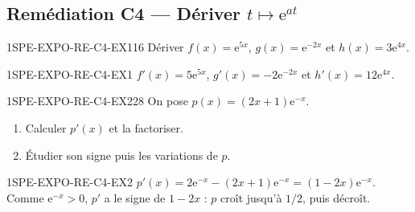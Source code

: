 
\subsection*{Remédiation C4 — Dériver $t\mapsto\mathrm{e}^{at}$}

\begin{exercice}{1SPE-EXPO-RE-C4-EX1}{1}{6}
Dériver $f(x)=\mathrm{e}^{5x}$, $g(x)=\mathrm{e}^{-2x}$ et $h(x)=3\mathrm{e}^{4x}$.
\end{exercice}
\begin{corrige}{1SPE-EXPO-RE-C4-EX1}
$f'(x)=5\mathrm{e}^{5x}$, $g'(x)=-2\mathrm{e}^{-2x}$ et $h'(x)=12\mathrm{e}^{4x}$.
\end{corrige}

\begin{exercice}{1SPE-EXPO-RE-C4-EX2}{2}{8}
On pose $p(x)=(2x+1)\mathrm{e}^{-x}$.
\begin{enumerate}
\item Calculer $p'(x)$ et la factoriser.
\item Étudier son signe puis les variations de $p$.
\end{enumerate}
\end{exercice}
\begin{corrige}{1SPE-EXPO-RE-C4-EX2}
$p'(x)=2\mathrm{e}^{-x}-(2x+1)\mathrm{e}^{-x}=(1-2x)\mathrm{e}^{-x}$. Comme $\mathrm{e}^{-x}>0$, $p'$ a le signe de $1-2x$ : $p$ croît jusqu'à $1/2$, puis décroît.
\end{corrige}


